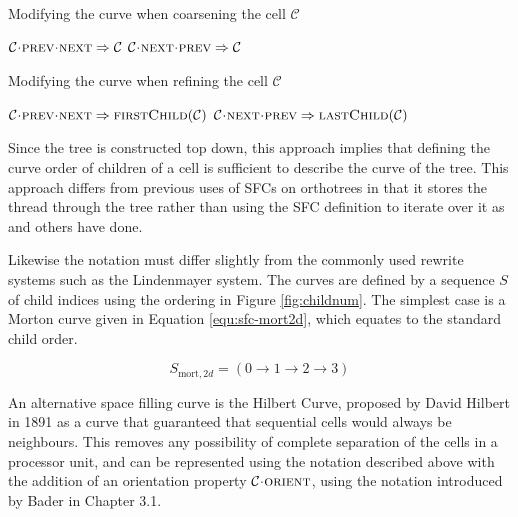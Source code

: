 \documentclass{IIBproject}
\newcommand{\acc}{{\mkern 0.5mu\cdot\mkern 0.5mu}}
\numberwithin{figure}{section}
\begin{document}
        \begin{algorithm}[H]
            \caption{Modifying the curve when coarsening the cell $\mathcal{C}$}
            \label{alg:sfc-coarsen}

            \begin{algorithmic}
                \State $\mathcal{C}\acc\textproc{prev}\acc\textproc{next} \Rightarrow \mathcal{C}$
                \State $\mathcal{C}\acc\textproc{next}\acc\textproc{prev} \Rightarrow \mathcal{C}$
            \end{algorithmic}
        \end{algorithm}

        \begin{algorithm}[H]
            \caption{Modifying the curve when refining the cell $\mathcal{C}$}
            \label{alg:sfc-refine}

            \begin{algorithmic}
                \Statex
                \State $\mathcal{C}\acc\textproc{prev}\acc\textproc{next} \Rightarrow \textproc{firstChild}(\mathcal{C})$
                \State $\mathcal{C}\acc\textproc{next}\acc\textproc{prev} \Rightarrow \textproc{lastChild}(\mathcal{C})$
            \end{algorithmic}
        \end{algorithm}

        Since the tree is constructed top down, this approach implies that defining the curve order of children of a cell is sufficient to describe the curve of the tree. This approach differs from previous uses of SFCs on orthotrees in that it stores the thread through the tree rather than using the SFC definition to iterate over it as \cite{bader2013} and others have done.

        Likewise the notation must differ slightly from the commonly used rewrite systems such as the Lindenmayer system. The curves are defined by a sequence $S$ of child indices using the ordering in Figure \ref{fig:childnum}. The simplest case is a Morton curve given in Equation \ref{equ:sfc-mort2d}, which equates to the standard child order.

        \begin{equation}
            \label{equ:sfc-mort2d}
            S_{\mathrm{mort},2d} = \left( 0 \to 1 \to 2 \to 3 \right)
        \end{equation}

        An alternative space filling curve is the Hilbert Curve, proposed by David Hilbert in 1891 as a curve that guaranteed that sequential cells would always be neighbours. This removes any possibility of complete separation of the cells in a processor unit, and can be represented using the notation described above with the addition of an orientation property $\mathcal{C}\acc\textproc{orient}$, using the notation introduced by Bader \cite{bader2013} in Chapter 3.1. 
\end{document}
